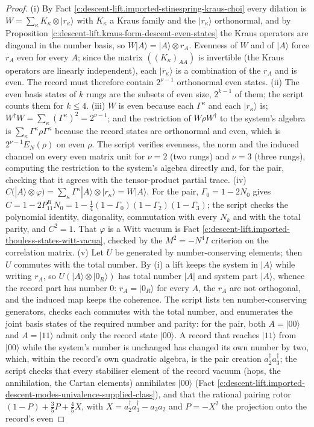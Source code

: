 \documentclass[11pt]{article}
\theoremstyle{definition}
\theoremstyle{plain}
\providecommand{\EN}{}\renewcommand{\EN}{E_{N}}
\providecommand{\G}{}\renewcommand{\G}{\Gamma}
\providecommand{\ket}{}\renewcommand{\ket}[1]{|#1\rangle}
\begin{document}
\begin{proof}
(i) By Fact \ref{c:descent-lift.imported-stinespring-kraus-choi} every dilation is $W = \sum_{\kappa}K_{\kappa} \otimes \ket{r_{\kappa}}$ with $K_{\kappa}$ a Kraus family and the $\ket{r_{\kappa}}$ orthonormal, and by Proposition \ref{c:descent-lift.kraus-form-descent-even-states} the Kraus operators are diagonal in the number basis, so $W\ket{A} = \ket{A} \otimes r_{A}$. Evenness of $W$ and of $\ket{A}$ force $r_{A}$ even for every $A$; since the matrix $((K_{\kappa})_{AA})$ is invertible (the Kraus operators are linearly independent), each $\ket{r_{\kappa}}$ is a combination of the $r_{A}$ and is even. The record must therefore contain $2^{\nu-1}$ orthonormal even states. (ii) The even basis states of $k$ rungs are the subsets of even size, $2^{k-1}$ of them; the script counts them for $k \leq 4$. (iii) $W$ is even because each $\G^{\kappa}$ and each $\ket{r_{\kappa}}$ is; $W^{\dagger}W = \sum_{\kappa}(\G^{\kappa})^{2} = 2^{\nu-1}$; and the restriction of $W\rho W^{\dagger}$ to the system's algebra is $\sum_{\kappa}\G^{\kappa}\rho\G^{\kappa}$ because the record states are orthonormal and even, which is $2^{\nu-1}\EN(\rho)$ on even $\rho$. The script verifies evenness, the norm and the induced channel on every even matrix unit for $\nu = 2$ (two rungs) and $\nu = 3$ (three rungs), computing the restriction to the system's algebra directly and, for the pair, checking that it agrees with the tensor-product partial trace. (iv) $C(\ket{A} \otimes \varphi) = \sum_{\kappa}\G^{\kappa}\ket{A} \otimes \ket{r_{\kappa}} = W\ket{A}$. For the pair, $\G_{0} = 1 - 2N_{0}$ gives $C = 1 - 2P^{R}_{11}N_{0} = 1 - \tfrac14(1 - \G_{0})(1 - \G_{2})(1 - \G_{3})$; the script checks the polynomial identity, diagonality, commutation with every $N_{k}$ and with the total parity, and $C^{2} = 1$. That $\varphi$ is a Witt vacuum is Fact \ref{c:descent-lift.imported-thouless-states-witt-vacua}, checked by the $M^{2} = -N^{4}I$ criterion on the correlation matrix. (v) Let $U$ be generated by number-conserving elements; then $U$ commutes with the total number. By (i) a lift keeps the system in $\ket{A}$ while writing $r_{A}$, so $U(\ket{A} \otimes \ket{0_{R}})$ has total number $|A|$ and system part $\ket{A}$, whence the record part has number $0$: $r_{A} = \ket{0_{R}}$ for every $A$, the $r_{A}$ are not orthogonal, and the induced map keeps the coherence. The script lists ten number-conserving generators, checks each commutes with the total number, and enumerates the joint basis states of the required number and parity: for the pair, both $A = \ket{00}$ and $A = \ket{11}$ admit only the record state $\ket{00}$. A record that reaches $\ket{11}$ from $\ket{00}$ while the system's number is unchanged has changed its own number by two, which, within the record's own quadratic algebra, is the pair creation $a^{\dagger}_{2}a^{\dagger}_{3}$; the script checks that every stabiliser element of the record vacuum (hops, the annihilation, the Cartan elements) annihilates $\ket{00}$ (Fact \ref{c:descent-lift.imported-descent-modes-univalence-supplied-class}), and that the rational pairing rotor $(1 - P) + \tfrac35 P + \tfrac45 X$, with $X = a^{\dagger}_{2}a^{\dagger}_{3} - a_{3}a_{2}$ and $P = -X^{2}$ the projection onto the record's even 
\end{proof}
\end{document}
